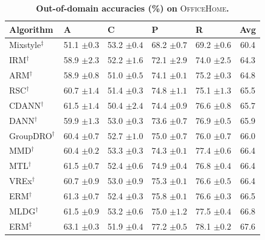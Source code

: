 \documentclass[10pt]{article}
\newcommand{\data}[1]{\textsc{#1}}
\begin{document}
\begin{table}[H]
\centering
\small
\renewcommand{\arraystretch}{1.1}
\caption{\small\textbf{Out-of-domain accuracies (\%) on} \data{OfficeHome}\textbf{.}}
\begin{tabular}{lllll|c}
\toprule
\textbf{Algorithm} & \textbf{A} & \textbf{C} & \textbf{P} & \textbf{R} & \textbf{Avg} \\
\midrule
Mixstyle$^\ddagger$ & 51.1 \scriptsize$\pm0.3$ & 53.2 \scriptsize$\pm0.4$ & 68.2 \scriptsize$\pm0.7$ & 69.2 \scriptsize$\pm0.6$ & 60.4 \\
IRM$^\dagger$ & 58.9 \scriptsize$\pm2.3$ & 52.2 \scriptsize$\pm1.6$ & 72.1 \scriptsize$\pm2.9$ & 74.0 \scriptsize$\pm2.5$ & 64.3 \\
ARM$^\dagger$ & 58.9 \scriptsize$\pm0.8$ & 51.0 \scriptsize$\pm0.5$ & 74.1 \scriptsize$\pm0.1$ & 75.2 \scriptsize$\pm0.3$ & 64.8 \\
RSC$^\dagger$ & 60.7 \scriptsize$\pm1.4$ & 51.4 \scriptsize$\pm0.3$ & 74.8 \scriptsize$\pm1.1$ & 75.1 \scriptsize$\pm1.3$ & 65.5 \\
CDANN$^\dagger$ & 61.5 \scriptsize$\pm1.4$ & 50.4 \scriptsize$\pm2.4$ & 74.4 \scriptsize$\pm0.9$ & 76.6 \scriptsize$\pm0.8$ & 65.7 \\
DANN$^\dagger$ & 59.9 \scriptsize$\pm1.3$ & 53.0 \scriptsize$\pm0.3$ & 73.6 \scriptsize$\pm0.7$ & 76.9 \scriptsize$\pm0.5$ & 65.9 \\
GroupDRO$^\dagger$ & 60.4 \scriptsize$\pm0.7$ & 52.7 \scriptsize$\pm1.0$ & 75.0 \scriptsize$\pm0.7$ & 76.0 \scriptsize$\pm0.7$ & 66.0 \\
MMD$^\dagger$ & 60.4 \scriptsize$\pm0.2$ & 53.3 \scriptsize$\pm0.3$ & 74.3 \scriptsize$\pm0.1$ & 77.4 \scriptsize$\pm0.6$ & 66.4 \\
MTL$^\dagger$ & 61.5 \scriptsize$\pm0.7$ & 52.4 \scriptsize$\pm0.6$ & 74.9 \scriptsize$\pm0.4$ & 76.8 \scriptsize$\pm0.4$ & 66.4 \\
VREx$^\dagger$ & 60.7 \scriptsize$\pm0.9$ & 53.0 \scriptsize$\pm0.9$ & 75.3 \scriptsize$\pm0.1$ & 76.6 \scriptsize$\pm0.5$ & 66.4 \\
ERM$^\dagger$ & 61.3 \scriptsize$\pm0.7$ & 52.4 \scriptsize$\pm0.3$ & 75.8 \scriptsize$\pm0.1$ & 76.6 \scriptsize$\pm0.3$ & 66.5 \\
MLDG$^\dagger$ & 61.5 \scriptsize$\pm0.9$ & 53.2 \scriptsize$\pm0.6$ & 75.0 \scriptsize$\pm1.2$ & 77.5 \scriptsize$\pm0.4$ & 66.8 \\
ERM$^\ddagger$ & 63.1 \scriptsize$\pm0.3$ & 51.9 \scriptsize$\pm0.4$ & 77.2 \scriptsize$\pm0.5$ & 78.1 \scriptsize$\pm0.2$ & 67.6 \\

\end{tabular}
\end{table}
\end{document}

